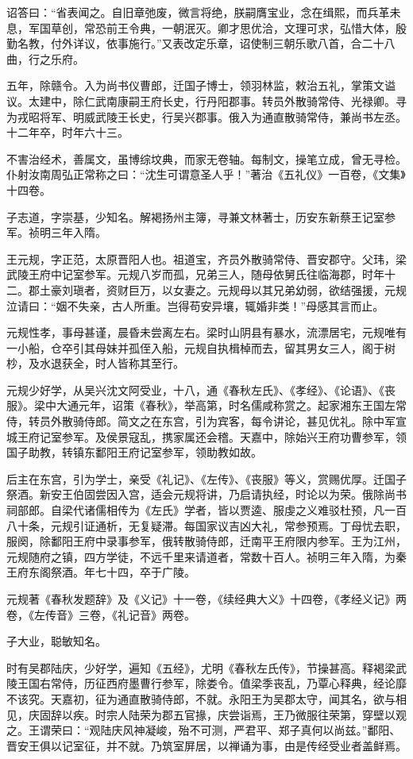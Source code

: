 \documentclass[]{article}
\begin{document}
诏答曰：``省表闻之。自旧章弛废，微言将绝，朕嗣膺宝业，念在缉熙，而兵革未息，军国草创，常恐前王令典，一朝泯灭。卿才思优洽，文理可求，弘惜大体，殷勤名教，付外详议，依事施行。''又表改定乐章，诏使制三朝乐歌八首，合二十八曲，行之乐府。

五年，除赣令。入为尚书仪曹郎，迁国子博士，领羽林监，敕治五礼，掌策文谥议。太建中，除仁武南康嗣王府长史，行丹阳郡事。转员外散骑常侍、光禄卿。寻为戎昭将军、明威武陵王长史，行吴兴郡事。俄入为通直散骑常侍，兼尚书左丞。十二年卒，时年六十三。

不害治经术，善属文，虽博综坟典，而家无卷轴。每制文，操笔立成，曾无寻检。仆射汝南周弘正常称之曰：``沈生可谓意圣人乎！''著治《五礼仪》一百卷，《文集》十四卷。

子志道，字崇基，少知名。解褐扬州主簿，寻兼文林著士，历安东新蔡王记室参军。祯明三年入隋。

王元规，字正范，太原晋阳人也。祖道宝，齐员外散骑常侍、晋安郡守。父玮，梁武陵王府中记室参军。元规八岁而孤，兄弟三人，随母依舅氏往临海郡，时年十二。郡土豪刘瑱者，资财巨万，以女妻之。元规母以其兄弟幼弱，欲结强援，元规泣请曰：``姻不失亲，古人所重。岂得苟安异壤，辄婚非类！''母感其言而止。

元规性孝，事母甚谨，晨昏未尝离左右。梁时山阴县有暴水，流漂居宅，元规唯有一小船，仓卒引其母妹并孤侄入船，元规自执楫棹而去，留其男女三人，阁于树杪，及水退获全，时人皆称其至行。

元规少好学，从吴兴沈文阿受业，十八，通《春秋左氏》、《孝经》、《论语》、《丧服》。梁中大通元年，诏策《春秋》，举高第，时名儒咸称赏之。起家湘东王国左常侍，转员外散骑侍郎。简文之在东宫，引为宾客，每令讲论，甚见优礼。除中军宣城王府记室参军。及侯景寇乱，携家属还会稽。天嘉中，除始兴王府功曹参军，领国子助教，转镇东鄱阳王府记室参军，领助教如故。

后主在东宫，引为学士，亲受《礼记》、《左传》、《丧服》等义，赏赐优厚。迁国子祭酒。新安王伯固尝因入宫，适会元规将讲，乃启请执经，时论以为荣。俄除尚书祠部郎。自梁代诸儒相传为《左氏》学者，皆以贾逵、服虔之义难驳杜预，凡一百八十条，元规引证通析，无复疑滞。每国家议吉凶大礼，常参预焉。丁母忧去职，服阕，除鄱阳王府中录事参军，俄转散骑侍郎，迁南平王府限内参军。王为江州，元规随府之镇，四方学徒，不远千里来请道者，常数十百人。祯明三年入隋，为秦王府东阁祭酒。年七十四，卒于广陵。

元规著《春秋发题辞》及《义记》十一卷，《续经典大义》十四卷，《孝经义记》两卷，《左传音》三卷，《礼记音》两卷。

子大业，聪敏知名。

时有吴郡陆庆，少好学，遍知《五经》，尤明《春秋左氏传》，节操甚高。释褐梁武陵王国右常侍，历征西府墨曹行参军，除娄令。值梁季丧乱，乃覃心释典，经论靡不该究。天嘉初，征为通直散骑侍郎，不就。永阳王为吴郡太守，闻其名，欲与相见，庆固辞以疾。时宗人陆荣为郡五官掾，庆尝诣焉，王乃微服往荣第，穿壁以观之。王谓荣曰：``观陆庆风神凝峻，殆不可测，严君平、郑子真何以尚兹。''鄱阳、晋安王俱以记室征，并不就。乃筑室屏居，以禅诵为事，由是传经受业者盖鲜焉。
\end{document}
